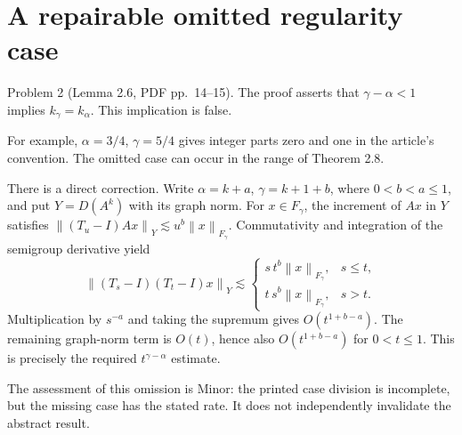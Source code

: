 \documentclass[10pt]{article}
\begin{document}
\section*{A repairable omitted regularity case}
Problem 2 (Lemma 2.6, PDF pp. 14–15).  The proof asserts that \(\gamma-\alpha<1\) implies \(k_\gamma=k_\alpha\). This implication is false.\par
For example, \(\alpha=3/4\), \(\gamma=5/4\) gives integer parts zero and one in the article’s convention. The omitted case can occur in the range of Theorem 2.8.\par
There is a direct correction. Write \(\alpha=k+a\), \(\gamma=k+1+b\), where \(0<b<a\le1\), and put \(Y=D(A^k)\) with its graph norm. For \(x\in F_\gamma\), the increment of \(Ax\) in \(Y\) satisfies \(\left\lVert(T_u-I)Ax\right\rVert_Y\lesssim u^b\left\lVert x\right\rVert_{F_\gamma}\). Commutativity and integration of the semigroup derivative yield \[\left\lVert(T_s-I)(T_t-I)x\right\rVert_Y
 \lesssim
 \begin{cases}
 s\,t^b\left\lVert x\right\rVert_{F_\gamma},&s\le t,\\
 t\,s^b\left\lVert x\right\rVert_{F_\gamma},&s>t.
 \end{cases}\] Multiplication by \(s^{-a}\) and taking the supremum gives \(O(t^{1+b-a})\). The remaining graph-norm term is \(O(t)\), hence also \(O(t^{1+b-a})\) for \(0<t\le1\). This is precisely the required \(t^{\gamma-\alpha}\) estimate.\par
The assessment of this omission is Minor: the printed case division is incomplete, but the missing case has the stated rate. It does not independently invalidate the abstract result.\par
\end{document}
